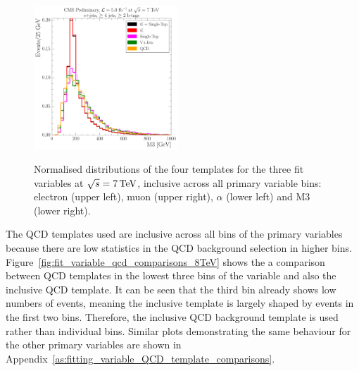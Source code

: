 \begin{figure}[hbtp]
     \includegraphics[width=0.48\textwidth]{Chapters/04_Analysis/04b_XSections/images/7TeV/fit_variables/MET/M3/MET_inclusive_M3_2orMoreBtags_templates.pdf}\\
	 \caption{Normalised distributions of the four templates for the three fit variables at $\sqrt{s}=7\,\text{Te\hspace{-.08em}V}$,
	 inclusive across all primary variable bins: electron \abseta (upper left), muon \abseta (upper right),
	 $\alpha$ (lower left) and M3 (lower right).}
     \label{fig:fit_variable_distributions_8TeV}
\end{figure}

The QCD templates used are inclusive across all bins of the primary variables because there are low statistics
in the QCD background selection in higher bins. Figure~\ref{fig:fit_variable_qcd_comparisons_8TeV} shows the
a comparison between QCD templates in the lowest three bins of the \met variable and also the inclusive \met
QCD template. It can be seen that the third \met bin already shows low numbers of events, meaning the
inclusive template is largely shaped by events in the first two bins. Therefore, the inclusive QCD
background template is used rather than individual bins. Similar plots demonstrating the same behaviour for
the other primary variables are shown in Appendix~\ref{as:fitting_variable_QCD_template_comparisons}.

